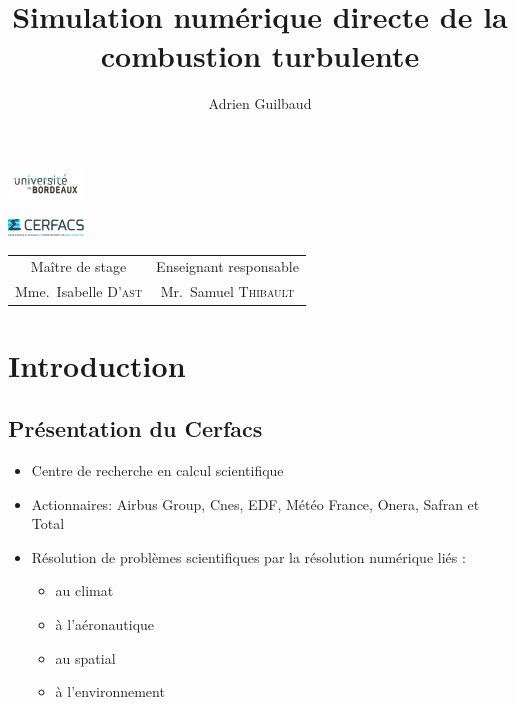 \documentclass{beamer}
\author{Adrien Guilbaud}
\title{Simulation numérique directe de la combustion turbulente}
\begin{document}

\begin{frame}[plain]
    \parbox[c]{-50cm}{\centering%
      \includegraphics[width=2cm]{figures/logo_fac.jpg}%
    }%
    \parbox[c]{19.5cm}{\centering%
      \includegraphics[width=2cm]{figures/logo_cerfacs.eps}
    }%
\maketitle

\centering
\footnotesize
\begin{tabular}{cc}
  Maître de stage & Enseignant responsable \\
  Mme.~Isabelle \textsc{D'ast} &   Mr.~Samuel \textsc{Thibault} \\
  \end{tabular}
\end{frame}

%
%

\section{Introduction}
\subsection{Présentation du Cerfacs}
\begin{frame}
  \begin{itemize}
  \item Centre de recherche en calcul scientifique
  \item Actionnaires: Airbus Group, Cnes, EDF, Météo France, Onera, Safran et Total
  
    \item Résolution de problèmes scientifiques par la résolution numérique liés :
	\begin{itemize}
  \item au climat
  \item à l'aéronautique
  \item au spatial
  \item à l'environnement
  \end{itemize}
  \end{itemize}


  
\end{frame}
\end{document}

